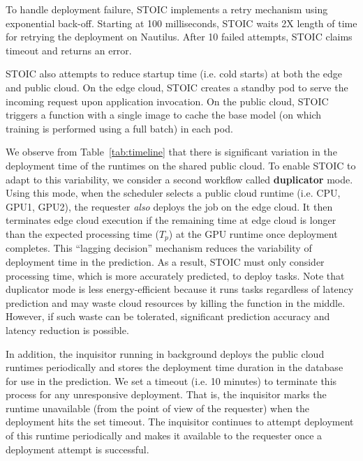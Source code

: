 To handle deployment failure, STOIC
implements a retry mechanism using exponential back-off. Starting at 100
milliseconds, STOIC waits 2X length of time for retrying the deployment on
Nautilus. After 10 failed attempts, STOIC claims timeout and returns an error.

STOIC also attempts to reduce startup time (i.e. cold starts) at both the
edge and public cloud.
On the edge cloud, STOIC creates a standby pod to serve
the incoming request upon application invocation. 
On the public cloud, STOIC triggers a function with a single 
image to cache the base model (on which training is performed using a
full batch) in each pod.
 

We observe from Table~\ref{tab:timeline} that there
is significant variation in the deployment time of the runtimes on the
shared public cloud.
To enable STOIC to adapt to this variability, we consider a second workflow
called \textbf{duplicator} mode.
Using this mode, when the scheduler selects a public cloud runtime (i.e. CPU, 
GPU1, GPU2), the requester \textit{also} deploys the job on the edge cloud.
It then terminates edge cloud execution if the remaining time at edge cloud is 
longer than the expected processing time ($T_p$) at the GPU runtime once 
deployment completes. 
This ``lagging decision'' mechanism reduces the variability of
deployment time in the prediction. As a result, 
STOIC must only consider processing time,
which is more accurately predicted, to deploy tasks. Note that duplicator 
mode is less energy-efficient because it runs tasks regardless of latency prediction
and may waste cloud resources by killing the function in the middle. 
However, if such waste can be tolerated, significant prediction accuracy 
and latency reduction is possible.

In addition, the inquisitor running in background deploys the 
public cloud runtimes periodically and stores the deployment time duration
in the database for use in the prediction.
We set a timeout (i.e. 10 minutes) to terminate this process
for any unresponsive deployment. That
is, the inquisitor marks the runtime unavailable (from the point of view of the
requester) when the deployment hits the set timeout. 
The inquisitor continues to attempt deployment of this runtime periodically and
makes it available to the requester once a deployment attempt is successful.

